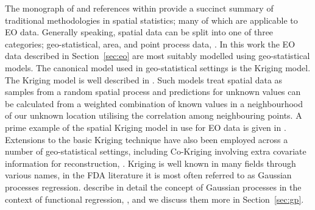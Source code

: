 The monograph of \cite{cressie_statistics_2015} and references within provide a succinct summary of traditional methodologies in spatial statistics; many of which are applicable to EO data.
Generally speaking, spatial data can be split into one of three categories; geo-statistical, area, and point process data, \citep{cressie_statistics_2015}.
In this work the EO data described in Section~\ref{sec:eo}  are most suitably modelled using geo-statistical models.
The canonical model used in geo-statistical settings is the Kriging model.
The Kriging model is well described in \cite{stein_interpolation_1999}.
Such models treat spatial data as samples from a random spatial process and predictions for unknown values can be calculated from a weighted combination of known values in a neighbourhood of our unknown location utilising the correlation among neighbouring points.
A prime example of the spatial Kriging model in use for EO data is given in \cite{rossi_kriging_1994}.
Extensions to the basic Kriging technique have also been employed across a number of geo-statistical settings, including Co-Kriging involving extra covariate information for reconstruction, \cite{zhang_restoration_2009}.
Kriging is well known in many fields through various names, in the FDA literature it is most often referred to as Gaussian processes regression.
\citeauthor{shi_gaussian_2011} describe in detail the concept of Gaussian processes in the context of functional regression, \citep{shi_gaussian_2011}, and we discuss them more in Section~\ref{sec:gp}. 

